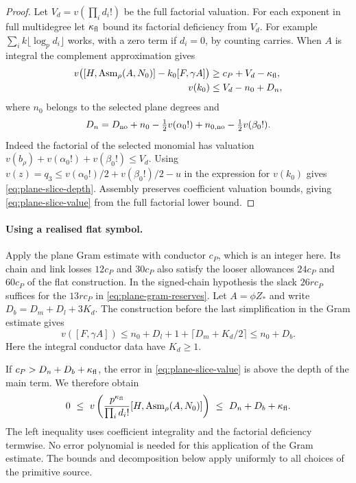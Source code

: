 \begin{proof}
Let \(V_d=v(\prod_i d_i!)\) be the full factorial valuation.
For each exponent in full multidegree let \(\kappa_{\rm fl}\)
bound its factorial deficiency from \(V_d\).
For example \(\sum_i k\lfloor\log_p d_i\rfloor\) works,
with a zero term if \(d_i=0\), by counting carries.
When \(A\) is integral the complement approximation gives
\begin{align}
 v\bigl([H,\operatorname{Asm}_\rho(A,N_0)]-k_0[F,\gamma A]\bigr)
       &\ge c_P+V_d-\kappa_{\rm fl}, \label{eq:plane-slice-value}\\
 v(k_0)&\le V_d-n_0+D_n, \label{eq:plane-slice-depth}
\end{align}
where \(n_0\) belongs to the selected plane degrees and
\[
 D_n=D_{\rm no}+
        n_0-\tfrac12v(\alpha_0!)+
        n_{0,{\rm no}}-\tfrac12v(\beta_0!).
\]
Indeed the factorial of the selected monomial has
valuation \(v(b_\rho)+v(\alpha_0!)+v(\beta_0!)\le V_d\).
Using \(v(z)=q_3\le v(\alpha_0!)/2+v(\beta_0!)/2-u\)
in the expression for \(v(k_0)\) gives
\eqref{eq:plane-slice-depth}. Assembly preserves coefficient
valuation bounds, giving \eqref{eq:plane-slice-value}
from the full factorial lower bound.

\end{proof}

\paragraph{Using a realised flat symbol.}
Apply the plane Gram estimate with conductor \(c_P\), which
is an integer here. Its chain and link losses \(12c_P\) and
\(30c_P\) also satisfy the looser allowances \(24c_P\) and
\(60c_P\) of the flat construction. In the signed-chain
hypothesis the slack \(26rc_P\) suffices for the \(13rc_P\)
in \eqref{eq:plane-gram-reserves}. Let \(A=\phi Z_*\)
and write \(D_b=D_m+D_l+3K_d\). The construction before
the last simplification in the Gram estimate gives
\[
 v([F,\gamma A])\le n_0+D_l+1+\lceil D_m+K_d/2\rceil
                 \le n_0+D_b .
\]
Here the integral conductor data have \(K_d\ge1\).

If \(c_P>D_n+D_b+\kappa_{\rm fl}\), the error in
\eqref{eq:plane-slice-value} is above the depth of the
main term. We therefore obtain
\[
 0\ \le\
 v\left(\frac{p^{\kappa_{\rm fl}}}
              {\prod_i d_i!}[H,\operatorname{Asm}_\rho(A,N_0)]\right)
 \ \le\ D_n+D_b+\kappa_{\rm fl}.
\]
The left inequality uses coefficient integrality and the
factorial deficiency termwise. No error polynomial is
needed for this application of the Gram estimate. The bounds and decomposition below apply uniformly
to all choices of the primitive source.

